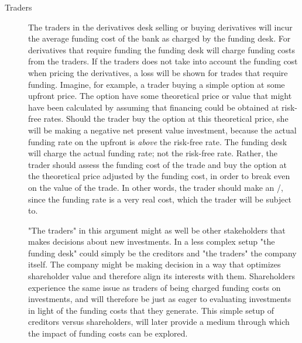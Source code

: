 \documentclass[../../../main.tex]{subfiles}
\begin{document}
        \begin{description}
            \item[Traders] The traders in the derivatives desk selling or buying derivatives 
            will incur the average funding cost of the bank as charged by the funding desk.
            For derivatives that require funding the funding desk will charge funding costs from the traders.
            If the traders does not take into account the funding cost when pricing the derivatives,
            a loss will be shown for trades that require funding.
            Imagine, for example, a trader buying a simple option at some upfront price.
            The option have some theoretical price or value that might have been calculated by assuming
            that financing could be obtained at risk-free rates. 
            Should the trader buy the option at this theoretical price, 
            she will be making a negative net present value investment, 
            because the actual funding rate on the upfront is \textit{above} the risk-free rate. 
            The funding desk will charge the actual funding rate; not the risk-free rate.
            Rather, the trader should assess the funding cost of the trade 
            and buy the option at the theoretical price adjusted by the funding cost,
            in order to break even on the value of the trade.
            In other words, the trader should make an \FVA/, 
            since the funding rate is a very real cost, which the trader will be subject to.
            
            "The traders" in this argument might as well be other stakeholders that makes decisions about new investments.
            In a less complex setup "the funding desk" could simply be the creditors and "the traders" the company itself.
            The company might be making decision in a way that optimizes shareholder value
            and therefore align its interests with them.
            Shareholders experience the same issue as traders of being charged funding costs on investments, 
            and will therefore be just as eager to evaluating investments in light of the funding costs that they generate.
            This simple setup of creditors versus shareholders, 
            will later provide a medium through which the impact of funding costs can be explored.


\end{description}
\end{document}
